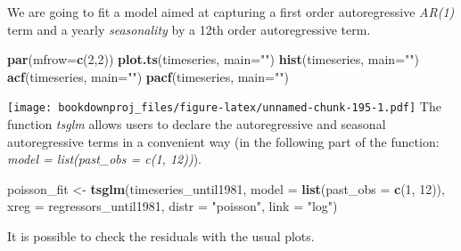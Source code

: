 \documentclass[
]{article}
\newenvironment{Shaded}{\begin{snugshade}}{\end{snugshade}}
\newcommand{\DataTypeTok}[1]{\textcolor[rgb]{0.13,0.29,0.53}{#1}}
\newcommand{\DecValTok}[1]{\textcolor[rgb]{0.00,0.00,0.81}{#1}}
\newcommand{\KeywordTok}[1]{\textcolor[rgb]{0.13,0.29,0.53}{\textbf{#1}}}
\newcommand{\NormalTok}[1]{#1}
\newcommand{\OperatorTok}[1]{\textcolor[rgb]{0.81,0.36,0.00}{\textbf{#1}}}
\newcommand{\StringTok}[1]{\textcolor[rgb]{0.31,0.60,0.02}{#1}}
\begin{document}
We are going to fit a model aimed at capturing a first order autoregressive \emph{AR(1)} term and a yearly \emph{seasonality} by a 12th order autoregressive term.

\begin{Shaded}
\begin{Highlighting}[]
\KeywordTok{par}\NormalTok{(}\DataTypeTok{mfrow=}\KeywordTok{c}\NormalTok{(}\DecValTok{2}\NormalTok{,}\DecValTok{2}\NormalTok{))}
\KeywordTok{plot.ts}\NormalTok{(timeseries, }\DataTypeTok{main=}\StringTok{""}\NormalTok{)}
\KeywordTok{hist}\NormalTok{(timeseries, }\DataTypeTok{main=}\StringTok{""}\NormalTok{)}
\KeywordTok{acf}\NormalTok{(timeseries, }\DataTypeTok{main=}\StringTok{""}\NormalTok{)}
\KeywordTok{pacf}\NormalTok{(timeseries, }\DataTypeTok{main=}\StringTok{""}\NormalTok{)}
\end{Highlighting}
\end{Shaded}

\texttt{[image: bookdownproj\_files/figure-latex/unnamed-chunk-195-1.pdf]}
The function \emph{tsglm} allows users to declare the autoregressive and seasonal autoregressive terms in a convenient way (in the following part of the function: \emph{model = list(past\_obs = c(1, 12))}).

\begin{Shaded}
\begin{Highlighting}[]
\NormalTok{poisson_fit <-}\StringTok{ }\KeywordTok{tsglm}\NormalTok{(timeseries_until1981,}
                     \DataTypeTok{model =} \KeywordTok{list}\NormalTok{(}\DataTypeTok{past_obs =} \KeywordTok{c}\NormalTok{(}\DecValTok{1}\NormalTok{, }\DecValTok{12}\NormalTok{)), }
                     \DataTypeTok{xreg =}\NormalTok{ regressors_until1981,}
                     \DataTypeTok{distr =} \StringTok{"poisson"}\NormalTok{, }\DataTypeTok{link =} \StringTok{"log"}\NormalTok{)}
\end{Highlighting}
\end{Shaded}

It is possible to check the residuals with the usual plots.

\begin{Shaded}
\end{Shaded}
\end{document}
